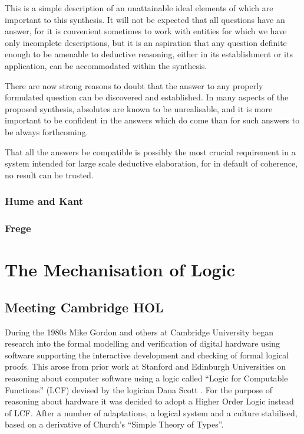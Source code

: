 \documentclass[10pt,titlepage]{book}
\begin{document}
This is a simple description of an unattainable ideal elements of which are important to this synthesis.
It will not be expected that all questions have an answer, for it is convenient sometimes to work with entities for which we have only incomplete descriptions, but it is an aspiration that any question definite enough to be amenable to deductive reasoning, either in its establishment or its application, can be accommodated within the synthesis.

There are now strong reasons to doubt that the answer to any properly formulated question can be discovered and established.
In many aspects of the proposed synthesis, absolutes are known to be unrealisable, and it is more important to be confident in the answers which do come than for such answers to be always forthcoming.

That all the answers be compatible is possibly the most crucial requirement in a system intended for large scale deductive elaboration, for in default of coherence, no result can be trusted.

\subsection{Hume and Kant}



\subsection{Frege}

\cite{frege1980}


\chapter{The Mechanisation of Logic}

\section{Meeting Cambridge HOL}

During the 1980s Mike Gordon and others at Cambridge University began research into the formal modelling and verification of digital hardware using software supporting the interactive development and checking of formal logical proofs.
This arose from prior work at Stanford and Edinburgh Universities on reasoning about computer software using a logic called ``Logic for Computable Functions'' (LCF) devised by the logician Dana Scott \cite{scott1993type}.
For the purpose of reasoning about hardware it was decided to adopt a Higher Order Logic instead of LCF.
After a number of adaptations, a logical system and a culture stabilised, based on a derivative of Church's ``Simple Theory of Types''\cite{churchSTT}.
\end{document}
